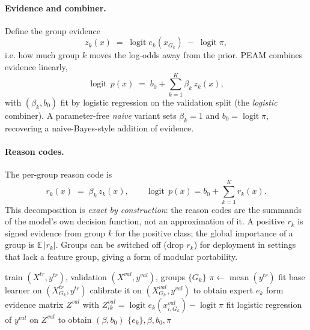 \documentclass{article}
\newcommand{\logit}{\operatorname{logit}}
\newcommand{\EE}{\mathbb{E}}
\begin{document}
\paragraph{Evidence and combiner.} Define the group evidence
\begin{equation}
z_k(x) \;=\; \logit e_k(x_{G_k}) \;-\; \logit \pi,
\end{equation}
i.e. how much group $k$ moves the log-odds away from the prior. PEAM combines
evidence linearly,
\begin{equation}
\logit\, p(x) \;=\; b_0 + \sum_{k=1}^K \beta_k\, z_k(x),
\label{eq:peam}
\end{equation}
with $(\beta_k, b_0)$ fit by logistic regression on the validation split
(the \emph{logistic} combiner). A parameter-free \emph{naive} variant sets
$\beta_k{=}1$ and $b_0 = \logit \pi$, recovering a naive-Bayes-style addition of
evidence.

\paragraph{Reason codes.} The per-group reason code is
\begin{equation}
r_k(x) \;=\; \beta_k\, z_k(x), \qquad \logit\, p(x) = b_0 + \sum_{k=1}^K r_k(x).
\end{equation}
This decomposition is \emph{exact by construction}: the reason codes are the
summands of the model's own decision function, not an approximation of it. A
positive $r_k$ is signed evidence from group $k$ for the positive class; the
global importance of a group is $\EE\,|r_k|$. Groups can be switched off
(drop $r_k$) for deployment in settings that lack a feature group, giving a
form of modular portability.

\begin{algorithm}[t]
\caption{PEAM training (logistic combiner)}
\label{alg:peam}
\begin{algorithmic}[1]
\Require train $(X^{tr},y^{tr})$, validation $(X^{val},y^{val})$, groups $\{G_k\}$
\State $\pi \gets \operatorname{mean}(y^{tr})$
  \State fit base learner on $(X^{tr}_{G_k}, y^{tr})$
  \State calibrate it on $(X^{val}_{G_k}, y^{val})$ to obtain expert $e_k$
\EndFor
\State form evidence matrix $Z^{val}$ with $Z^{val}_{ik} = \logit e_k(x^{val}_{i,G_k}) - \logit\pi$
\State fit logistic regression of $y^{val}$ on $Z^{val}$ to obtain $(\beta, b_0)$
\State \Return $\{e_k\}, \beta, b_0, \pi$
\end{algorithmic}
\end{algorithm}
\end{document}
